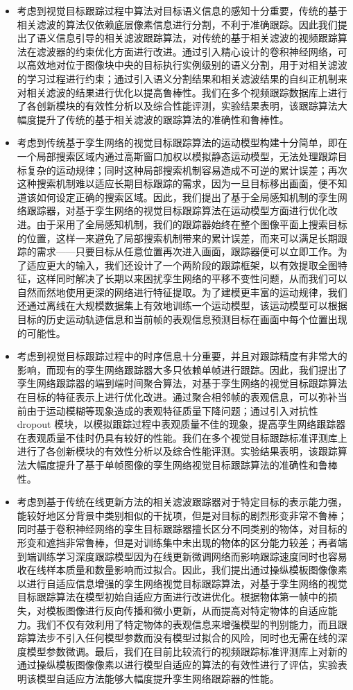 \begin{itemize}
\item 考虑到视觉目标跟踪过程中算法对目标语义信息的感知十分重要，传统的基于相关滤波的算法仅依赖底层像素信息进行分割，不利于准确跟踪。因此我们提出了语义信息引导的相关滤波跟踪算法，对传统的基于相关滤波的视频跟踪算法在滤波器的约束优化方面进行改进。通过引入精心设计的卷积神经网络，可以高效地对位于图像块中央的目标执行实例级别的语义分割，用于对相关滤波的学习过程进行约束；通过引入语义分割结果和相关滤波结果的自纠正机制来对相关滤波的结果进行优化以提高鲁棒性。我们在多个视频跟踪数据库上进行了各创新模块的有效性分析以及综合性能评测，实验结果表明，该跟踪算法大幅度提升了传统的基于相关滤波的跟踪算法的准确性和鲁棒性。
\item 考虑到传统基于孪生网络的视觉目标跟踪算法的运动模型构建十分简单，即在一个局部搜索区域内通过高斯窗口加权以模拟静态运动模型，无法处理跟踪目标复杂的运动规律；同时这种局部搜索机制容易造成不可逆的累计误差；再次这种搜索机制难以适应长期目标跟踪的需求，因为一旦目标移出画面，便不知道该如何设定正确的搜索区域。因此，我们提出了基于全局感知机制的孪生网络跟踪器，对基于孪生网络的视觉目标跟踪算法在运动模型方面进行优化改进。由于采用了全局感知机制，我们的跟踪器始终在整个图像平面上搜索目标的位置，这样一来避免了局部搜索机制带来的累计误差，而来可以满足长期跟踪的需求——只要目标从任意位置再次进入画面，跟踪器便可以立即工作。为了适应更大的输入，我们还设计了一个两阶段的跟踪框架，以有效提取全图特征，这样同时解决了长期以来困扰孪生网络的平移不变性问题，从而我们可以自然而然地使用更深的网络进行特征提取。为了建模更丰富的运动规律，我们还通过离线在大规模数据集上有效地训练一个运动模型，该运动模型可以根据目标的历史运动轨迹信息和当前帧的表观信息预测目标在画面中每个位置出现的可能性。
\item 考虑到视觉目标跟踪过程中的时序信息十分重要，并且对跟踪精度有非常大的影响，而现有的孪生网络跟踪器大多只依赖单帧进行跟踪。因此，我们提出了孪生网络跟踪器的端到端时间聚合算法，对基于孪生网络的视觉目标跟踪算法在目标的特征表示上进行优化改进。通过聚合相邻帧的表观信息，可以弥补当前由于运动模糊等现象造成的表观特征质量下降问题；通过引入对抗性 dropout 模块，以模拟跟踪过程中表观质量不佳的现象，提高孪生网络跟踪器在表观质量不佳时仍具有较好的性能。我们在多个视觉目标跟踪标准评测库上进行了各创新模块的有效性分析以及综合性能评测。实验结果表明，该跟踪算法大幅度提升了基于单帧图像的孪生网络视觉目标跟踪算法的准确性和鲁棒性。
\item 考虑到基于传统在线更新方法的相关滤波跟踪器对于特定目标的表示能力强，能较好地区分背景中类别相似的干扰项，但是对目标的剧烈形变非常不鲁棒；同时基于卷积神经网络的孪生目标跟踪器擅长区分不同类别的物体，对目标的形变和遮挡非常鲁棒，但是对训练集中未出现的物体的区分能力较差；再者端到端训练学习深度跟踪模型因为在线更新微调网络而影响跟踪速度同时也容易收在线样本质量和数量影响而过拟合。因此，我们提出通过操纵模板图像像素以进行自适应信息增强的孪生网络视觉目标跟踪算法，对基于孪生网络的视觉目标跟踪算法在模型初始自适应方面进行改进优化。根据物体第一帧中的损失，对模板图像进行反向传播和微小更新，从而提高对特定物体的自适应能力。我们不仅有效利用了特定物体的表观信息来增强模型的判别能力，而且跟踪算法步不引入任何模型参数而没有模型过拟合的风险，同时也无需在线的深度模型参数微调。最后，我们在目前比较流行的视频跟踪标准评测库上对新的通过操纵模板图像像素以进行模型自适应的算法的有效性进行了评估，实验表明该模型自适应方法能够大幅度提升孪生网络跟踪器的性能。

\end{itemize}
